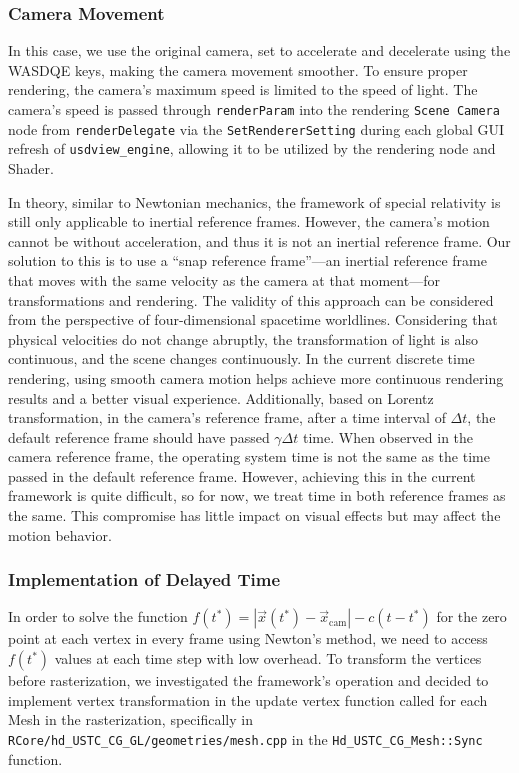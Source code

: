 \documentclass{article}
\begin{document}
\subsubsection*{Camera Movement}

In this case, we use the original camera, set to accelerate and decelerate using the WASDQE keys, making the camera movement smoother. To ensure proper rendering, the camera's maximum speed is limited to the speed of light. The camera's speed is passed through \lstinline|renderParam| into the rendering \lstinline|Scene Camera| node from \lstinline|renderDelegate| via the \lstinline|SetRendererSetting| during each global GUI refresh of \lstinline|usdview_engine|, allowing it to be utilized by the rendering node and Shader.

In theory, similar to Newtonian mechanics, the framework of special relativity is still only applicable to inertial reference frames. However, the camera’s motion cannot be without acceleration, and thus it is not an inertial reference frame. Our solution to this is to use a “snap reference frame”—an inertial reference frame that moves with the same velocity as the camera at that moment—for transformations and rendering. The validity of this approach can be considered from the perspective of four-dimensional spacetime worldlines. Considering that physical velocities do not change abruptly, the transformation of light is also continuous, and the scene changes continuously. In the current discrete time rendering, using smooth camera motion helps achieve more continuous rendering results and a better visual experience. Additionally, based on Lorentz transformation, in the camera’s reference frame, after a time interval of $\Delta t$, the default reference frame should have passed $\gamma \Delta t$ time. When observed in the camera reference frame, the operating system time is not the same as the time passed in the default reference frame. However, achieving this in the current framework is quite difficult, so for now, we treat time in both reference frames as the same. This compromise has little impact on visual effects but may affect the motion behavior.

\subsubsection*{Implementation of Delayed Time}

In order to solve the function $f(t^{*})=|\vec{x}(t^{*}) - \vec{x}_{\text{cam}}| - c(t - t^{*})$ for the zero point at each vertex in every frame using Newton's method, we need to access $f(t^{*})$ values at each time step with low overhead. To transform the vertices before rasterization, we investigated the framework's operation and decided to implement vertex transformation in the update vertex function called for each Mesh in the rasterization, specifically in \lstinline|RCore/hd_USTC_CG_GL/geometries/mesh.cpp| in the \lstinline|Hd_USTC_CG_Mesh::Sync| function.
\end{document}
